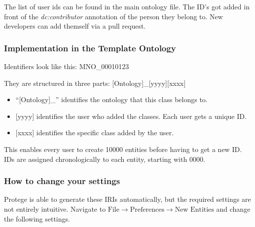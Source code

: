 The list of user ids can be found in the main ontology file. The ID's got added in front of the \emph{dc:contributor}
annotation of the person they belong to. New developers can add themself via a pull request.


\subsubsection{Implementation in the Template Ontology}\label{sssec:implementation-in-the-mno}

Identifiers look like this: MNO\_00010123

They are structured in three parts: {[}Ontology{]}\_{[}yyyy{]}{[}xxxx{]}
\begin{itemize}
    \item ``{[}Ontology{]}\_'' identifies the ontology that this class belongs to. 
    \item {[}yyyy{]} identifies the user who added the classes. Each user gets a unique ID.
    \item {[}xxxx{]} identifies the
specific class added by the user. 
\end{itemize}

This enables every user to create 10000 entities before having to get a new ID. IDs are assigned chronologically to each entity, starting with 0000.


\subsubsection{How to change your
settings}
\label{sssec:how-to-change-your-settings}

Protege is able to generate these IRIs automatically, but the required settings are not entirely intuitive. Navigate to \textit{$\text{File}\rightarrow\text{Preferences}\rightarrow\text{New Entities}$} and change the following settings. 

